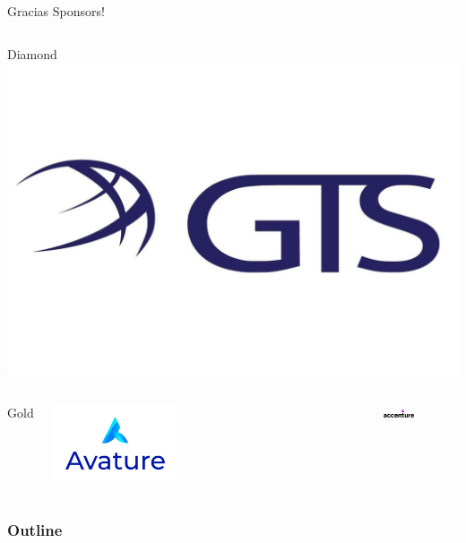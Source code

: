 \documentclass{beamer}
\begin{document}
\begin{frame}{Gracias Sponsors!}
\begin{columns}[t]
        \centering
        Diamond\\
        \includegraphics[width=1\textwidth,keepaspectratio]{GTSlogo.jpeg}
    \end{columns}
    \begin{columns}[t]
        \centering
        Gold\\
        \begin{minipage}{0.5\textwidth}
            \centering
            \includegraphics[width=0.4\textwidth,keepaspectratio]{avature.jpg}
        \end{minipage}%
        \begin{minipage}{0.5\textwidth}
            \centering
            \includegraphics[width=0.4\textwidth,keepaspectratio]{Acc_Logo_Black_Purple_RGB.png}
        \end{minipage}
    \end{columns}
\end{frame}


\begin{frame}
\frametitle{Outline}
\tableofcontents
\end{frame}
\end{document}
